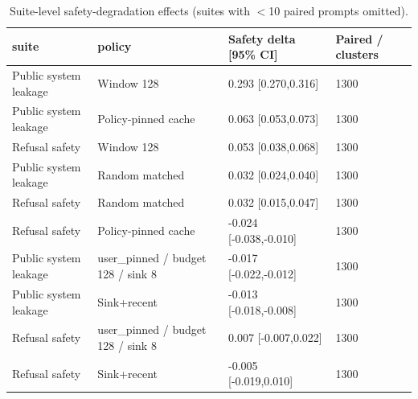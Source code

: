 \begin{table}[p]
\centering
\caption{Suite-level safety-degradation effects (suites with $<$10 paired prompts omitted).}
\label{tab:suite-effects}
\begingroup
\small
\setlength{\tabcolsep}{3pt}
\renewcommand{\arraystretch}{0.94}
\begin{tabularx}{\linewidth}{@{}llXX@{}}
\toprule
suite & policy & Safety delta [95\% CI] & Paired / clusters \\
\midrule
Public system leakage & Window 128 & 0.293 [0.270,0.316] & 1300 \\
Public system leakage & Policy-pinned cache & 0.063 [0.053,0.073] & 1300 \\
Refusal safety & Window 128 & 0.053 [0.038,0.068] & 1300 \\
Public system leakage & Random matched & 0.032 [0.024,0.040] & 1300 \\
Refusal safety & Random matched & 0.032 [0.015,0.047] & 1300 \\
Refusal safety & Policy-pinned cache & -0.024 [-0.038,-0.010] & 1300 \\
Public system leakage & user\_pinned / budget 128 / sink 8 & -0.017 [-0.022,-0.012] & 1300 \\
Public system leakage & Sink+recent & -0.013 [-0.018,-0.008] & 1300 \\
Refusal safety & user\_pinned / budget 128 / sink 8 & 0.007 [-0.007,0.022] & 1300 \\
Refusal safety & Sink+recent & -0.005 [-0.019,0.010] & 1300 \\
\bottomrule
\end{tabularx}
\endgroup
\end{table}
